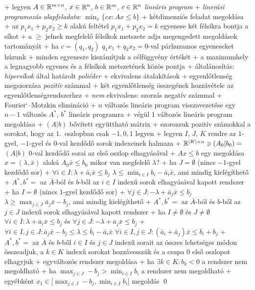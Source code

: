 
+ legyen $A \in \mathbb{R}^{m \times n}$, $x \in \mathbb{R}^n$, $b \in \mathbb{R}^m$, $c \in
  \mathbb{R}^n$ \RA \emph{lineáris program}
+ \dfn \emph{linerási programozás alapfeladata}: $\min_{x} \{ cx : Ax
  \le b \}$
+ kétdimenziós feladat megoldása
  + az $p_1 x_1 + p_2 x_2 \ge k$ alakú feltétel $p_1 x_1 + p_2
  x_2 = k$ egyenese két félsíkra bontja a síkot
    + a $\ge$ jelnek megfelelő félsíkok metszete adja megengedett
      megoldások tartományát
  + ha $c = (q_1, q_2)$ \RA $q_1 x_1 + q_2 x_2 = 0$-val párhuzamos
  egyeneseket húzunk
    + minden egyenesre kiszámítjuk a célfüggvény értékét
    + a maximumhely a legnagyobb egyenes és a félsíkok metszetének
    közös pontja
  + általánosítás: \emph{hipersíkok} által határolt \emph{poliéder}
+ ekvivalens átalakítások
  + egyenlőtlenség megszorzása \emph{pozitív} számmal
  + két egyenlőtlenség összegének hozzávétele az egyenlőtlenségrendszerhez
  + \emph{nem} ekvivalens: szorzás negatív számmal
+ \alg Fourier`--Motzkin elimináció
  + $n$ változós lineáris program visszavezetése egy $n - 1$ változós
    $A^*$, $b^*$ lineáris programra
  + végül $1$ változós lineáris program megoldása
  + $(A|b)$ bővített együttható mátrix
    + szorozzuk pozitív számokkal a
      sorokat, hogy az $1$.~oszlopban csak $-1, 0, 1$ legyen
  + legyen $I$, $J$, $K$ rendre az $1$-gyel, $-1$-gyel és $0$-val
    kezdődő sorok indexeinek halmaza
  + $\mathbb{R}^{\lvert K \rvert \times n} \ni (A_0|b_0) =$ $(A|b)$ $0$-val
    kezdődő sorai az első oszlop elhagyásával
  + $Ax \le b$ egy megoldása $x = (\lambda, \bar{x})$ alakú \RA $A_0
    \bar{x} \le b_0$ \RA mikor van megfelelő $\lambda$?
  + ha $J = \emptyset$ (nincs $-1$-gyel kezdődő sor)
    + $\forall i \in I : \lambda + \bar{a}_i \bar{x} \le b_j$ \RA
      $\lambda \le \min_{i \in I} b_i - \bar{a}_i \bar{x}$, ami mindig
      kielégíthető
    + $A^*, b^* =$ az $\bar{A}$-ból és $b$-ből az $i \in I$ indexű sorok
      elhagyásával kapott rendszer
  + ha $I = \emptyset$ (nincs $1$-gyel kezdődő sor)
    + $\forall j \in J : -\lambda + \bar{a}_j \bar{x} \le b_j$ \RA
      $\lambda \ge \max_{j \in J} \bar{a}_j \bar{x} - b_j$, ami mindig
      kielégíthető
    + $A^*, b^* =$ az $\bar{A}$-ból és $b$-ből az $j \in J$ indexű sorok
      elhagyásával kapott rendszer
  + ha $I \ne \emptyset$ és $J \ne \emptyset$ \RA
    $\forall i \in I : \lambda + \bar{a}_i \bar{x} \le b_j$ és
    $\forall j \in J : -\lambda + \bar{a}_j \bar{x} \le b_j$
    + $\forall i \in I, j \in J: \bar{a}_j \bar{x} - b_j \le \lambda
      \le \bar{b}_i - \bar{a}_i \bar{x}$ \RA $\forall i \in I, j \in J:
      (\bar{a}_i + \bar{a}_j) \bar{x} \le b_i + b_j$
    + $A^*, b^* =$ az $\bar{A}$ és $b$-ből $i \in I$ és $j \in J$
      indexű sorait az összes lehetséges módon összeadjuk, a $k \in K$
      indexű sorokat hozzávesszük és a csupa $0$ első oszlopot
      elhagyjuk
  + egyváltozós rendszer megoldása
    + ha $\exists k \in K : b_k < 0$ \RA a rendszer nem megoldható
    + ha $\max_{j \in J} -b_j > \min_{i \in I} b_i$ \RA a rendszer nem
      megoldható
    + egyébként \RA $x_1 \in \bigl[\max_{j \in J} -b_j, \min_{i \in I}
      b_i\bigr]$ megoldás \qed

